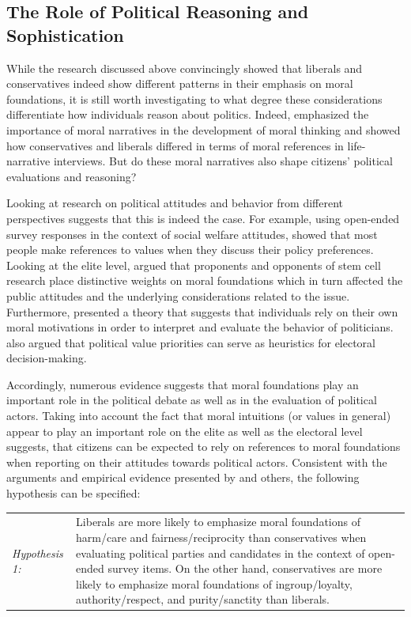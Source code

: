 \documentclass[12pt]{article}
\begin{document}
\subsection{The Role of Political Reasoning and Sophistication}

While the research discussed above convincingly showed that liberals and conservatives indeed show different patterns in their emphasis on moral foundations, it is still worth investigating to what degree these considerations differentiate how individuals reason about politics. Indeed, \citet{haidt2008moral} emphasized the importance of moral narratives in the development of moral thinking and \citet{mcadams2008family} showed how conservatives and liberals differed in terms of moral references in life-narrative interviews. But do these moral narratives also shape citizens' political evaluations and reasoning?

Looking at research on political attitudes and behavior from different perspectives suggests that this is indeed the case. For example, using open-ended survey responses in the context of social welfare attitudes, \citet{feldman1992political} showed that most people make references to values when they discuss their policy preferences. Looking at the elite level, \citet{clifford2013words} argued that proponents and opponents of stem cell research place distinctive weights on moral foundations which in turn affected the public attitudes and the underlying considerations related to the issue. Furthermore, \citet{clifford2014linking} presented a theory that suggests that individuals rely on their own moral motivations in order to interpret and evaluate the behavior of politicians. \citet{marietta2007values} also argued that political value priorities can serve as heuristics for electoral decision-making.

Accordingly, numerous evidence suggests that moral foundations play an important role in the political debate as well as in the evaluation of political actors. Taking into account the fact that moral intuitions (or values in general) appear to play an important role on the elite as well as the electoral level suggests, that citizens can be expected to rely on references to moral foundations when reporting on their attitudes towards political actors. Consistent with the arguments and empirical evidence presented by \citet{graham2009liberals} and others, the following hypothesis can be specified:

\vspace{0.3cm}
\begin{tabular}{lp{12cm}}
\textsl{Hypothesis 1:} & Liberals are more likely to emphasize moral foundations of harm/care and fairness/reciprocity  than conservatives when evaluating political parties and candidates in the context of open-ended survey items. On the other hand, conservatives are more likely to emphasize moral foundations of ingroup/loyalty, authority/respect, and purity/sanctity than liberals.
\end{tabular}
\vspace{0.5cm}
\end{document}
